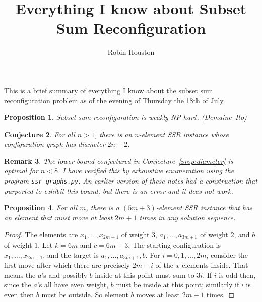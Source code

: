 \documentclass{robinminion}
\author{Robin Houston}
\title{Everything I know about Subset Sum Reconfiguration}
\newtheorem{prop}{Proposition}
\newtheorem{conjecture}[prop]{Conjecture}
\newtheorem{rem}[prop]{Remark}
\begin{document}
\maketitle
\linespread{1.1}\selectfont

\noindent This is a brief summary of everything I know about the subset sum reconfiguration problem as of the evening of Thursday the 18th of July.

\begin{prop}
    Subset sum reconfiguration is weakly NP-hard. \textup(Demaine--Ito\textup)
\end{prop}

\begin{conjecture}\label{conjecture:diameter}
    For all $n>1$, there is an $n$-element SSR instance whose configuration graph has diameter $2n-2$.
\end{conjecture}

\begin{rem}
    The lower bound conjectured in Conjecture~\ref{prop:diameter} is optimal for $n<8$. I have verified this by exhaustive enumeration using the program \texttt{ssr\_graphs.py}. An earlier version of these notes had a construction that purported to exhibit this bound, but there is an error and it does not work.
\end{rem}

\begin{prop}\label{prop:element-moves-a-lot}
    For all $m$, there is a $(5m+3)$-element SSR instance that has an element that must move at least $2m+1$ times in any solution sequence.
\end{prop}
\begin{proof}
    The elements are $x_1, \dots, x_{2m+1}$ of weight $3$, $a_1, \dots, a_{3m+1}$ of weight $2$, and $b$ of weight $1$.
    Let $k=6m$ and $c=6m+3$. The starting configuration is $x_1, \dots, x_{2m+1}$, and the target is $a_1, \dots, a_{3m+1}, b$. For $i=0, 1, \dots, 2m$, consider the first move after which there are precisely $2m-i$ of the $x$ elements inside. That means the $a$'s and possibly $b$ inside at this point must sum to $3i$. If $i$ is odd then, since the $a$'s all have even weight, $b$ must be inside at this point; similarly if $i$ is even then $b$ must be outside. So element $b$ moves at least $2m+1$ times.
\end{proof}
\end{document}

